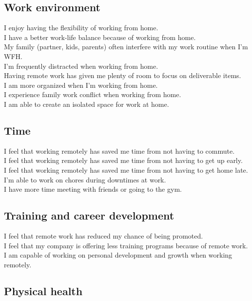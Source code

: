\documentclass[12pt]{article}
\begin{document}
\subsection*{Work environment}

I enjoy having the flexibility of working from home.  \\
I have a better work-life balance because of working from home. \\
My family (partner, kids, parents) often interfere with my work routine when I’m WFH. \\
I’m frequently distracted when working from home.  \\
Having remote work has given me plenty of room to focus on deliverable items.  \\
I am more organized when I’m working from home.  \\
I experience family work conflict when working from home. \\
I am able to create an isolated space for work at home.

\subsection*{Time} 

I feel that working remotely has saved me time from not having to commute. \\
I feel that working remotely has saved me time from not having to get up early. \\
I feel that working remotely has saved me time from not having to get home late. \\
I’m able to work on chores during downtimes at work.  \\
I have more time meeting with friends or going to the gym.

\subsection*{Training and career development}

I feel that remote work has reduced my chance of being promoted. \\
I feel that my company is offering less training programs because of remote work. \\
I am capable of working on personal development and growth when working remotely.


\subsection*{Physical health}
\end{document}
